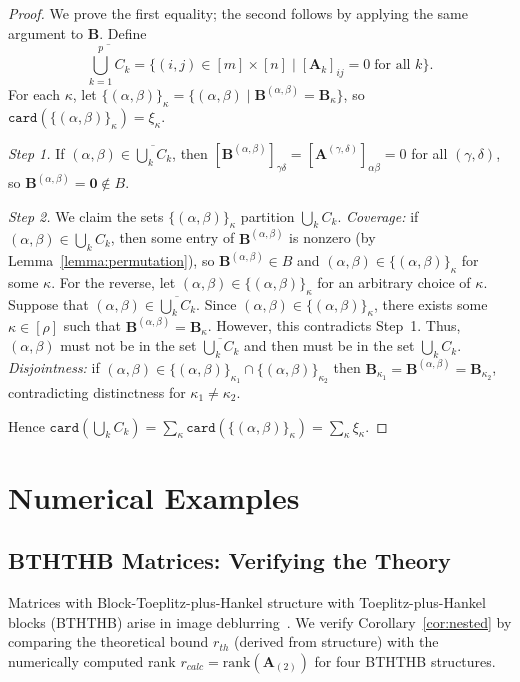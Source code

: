 \documentclass{siamart251216}
\newcommand{\munfold}[2]{\mathbf{#1}_{(#2)}}
\def\bA{\mathbf{A}}
\def\bB{\mathbf{B}}
\def\bzero{\mathbf{0}}
\begin{document}
\begin{proof}
We prove the first equality; the second follows by applying the same argument to $\bB$.  Define
$$\overline{\bigcup_{k=1}^{p} C_k} = \{(i,j)\in [m]\times [n]\mid[\bA_k]_{ij}=0\;\mbox{for all } k\}.$$  For each $\kappa$, let
$\{(\alpha,\beta)\}_\kappa = \{(\alpha,\beta)\mid\bB^{(\alpha,\beta)}=\bB_\kappa\}$, so
$\mathtt{card}(\{(\alpha,\beta)\}_\kappa) = \xi_\kappa$.

\emph{Step 1.}  If $(\alpha,\beta)\in\overline{\bigcup_k C_k}$, then
$[\bB^{(\alpha,\beta)}]_{\gamma\delta} = [\bA^{(\gamma,\delta)}]_{\alpha\beta} = 0$ for all
$(\gamma,\delta)$, so $\bB^{(\alpha,\beta)}=\bzero\notin B$.

\emph{Step 2.}  We claim the sets $\{(\alpha,\beta)\}_\kappa$ partition $\bigcup_k C_k$.
\emph{Coverage:} if $(\alpha,\beta)\in\bigcup_k C_k$, then some entry of $\bB^{(\alpha,\beta)}$
is nonzero (by Lemma~\ref{lemma:permutation}), so $\bB^{(\alpha,\beta)}\in B$ and
$(\alpha,\beta)\in\{(\alpha,\beta)\}_\kappa$ for some $\kappa$.  For the reverse, let $(\alpha,\beta)\in\{(\alpha,\beta)\}_{\kappa}$ for an arbitrary choice of $\kappa$. Suppose that $(\alpha,\beta)\in\overline{\bigcup_k C_{k}}$. Since $(\alpha,\beta)\in\{(\alpha,\beta)\}_{\kappa}$, there exists some $\kappa\in[\rho]$ such that $\bB^{(\alpha,\beta)} = \bB_{\kappa}$. However, this contradicts Step~1. Thus, $(\alpha,\beta)$ must not be in the set $\overline{\bigcup_k C_{k}}$ and then must be in the set $\bigcup_k C_{k}$. \emph{Disjointness:} if $(\alpha,\beta)\in\{(\alpha,\beta)\}_{\kappa_1}\cap
\{(\alpha,\beta)\}_{\kappa_2}$ then $\bB_{\kappa_1}=\bB^{(\alpha,\beta)}=\bB_{\kappa_2}$,
contradicting distinctness for $\kappa_1\ne\kappa_2$.

Hence $\mathtt{card}(\bigcup_k C_k) = \sum_\kappa\mathtt{card}(\{(\alpha,\beta)\}_\kappa)
= \sum_\kappa\xi_\kappa$.
\end{proof}

\section{Numerical Examples}
\label{sec:num_results}

\subsection{BTHTHB Matrices: Verifying the Theory}
\label{sec:t_plus_h}

Matrices with \linebreak Block-Toeplitz-plus-Hankel structure with Toeplitz-plus-Hankel blocks (BTHTHB) arise in image
deblurring~\cite{hansen2006deblur,kilmer2007tplush,nagy2004reflexivekron}.  We verify
Corollary~\ref{cor:nested} by comparing the theoretical bound $r_{th}$ (derived from structure)
with the numerically computed rank $r_{calc}=\mathrm{rank}(\munfold{A}{2})$ for four BTHTHB
structures.
\end{document}
